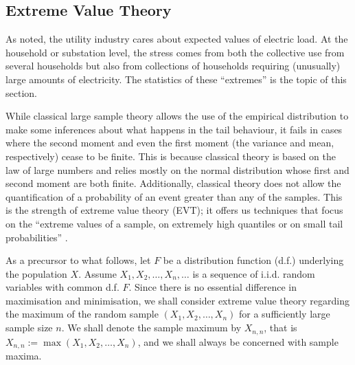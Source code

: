 \documentclass[a4paper]{article}
\begin{document}

\subsection{Extreme Value Theory}
\label{subsec:EVT}
As \cite{hong16} noted, the utility industry cares about expected values of electric load. At the household or substation level, the stress comes from both the collective use from several households but also from collections of households requiring (unusually) large amounts of electricity. The statistics of these ``extremes'' is the topic of this section.

While classical large sample theory allows the use of the empirical distribution to make some inferences about what happens in the tail behaviour, it fails in cases where the second moment and even the first moment (the variance and mean, respectively) cease to be finite. This is because classical theory is based on the law of large numbers and relies mostly on the normal distribution whose first and second moment are both finite. Additionally, classical theory does not allow the quantification of a probability of an event greater than any of the samples. This is the strength of extreme value theory (EVT); it offers us techniques that focus on the ``extreme values of a sample, on extremely high quantiles or on small tail probabilities'' \cite[ch.~1]{beirlant}.

As a precursor to what follows, %
let $F$ be a distribution function (d.f.) underlying the population $X$. Assume $X_1,X_2, \ldots, X_n, \ldots$ is a sequence of i.i.d. random variables with common d.f. $F$. Since there is no essential difference in maximisation and minimisation, we shall consider extreme value theory regarding the maximum of the random sample $(X_1,X_2, \ldots, X_n)$ for a sufficiently large sample size $n$. We shall denote the sample maximum by $X_{n,n}$, that is $X_{n,n}:= \max(X_1,X_2, \ldots, X_n)$, and we shall always be concerned with sample maxima.
\end{document}
